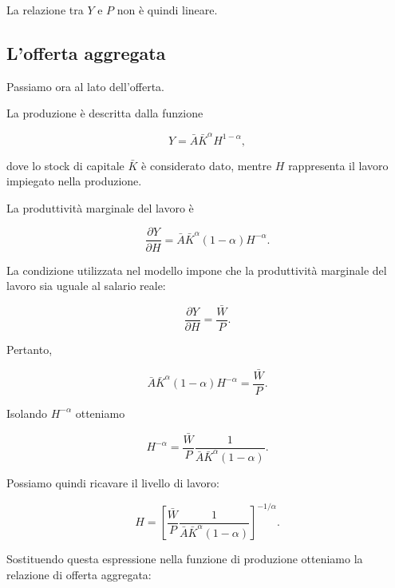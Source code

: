 La relazione tra $Y$ e $P$ non è quindi lineare.


\subsection{L'offerta aggregata}

Passiamo ora al lato dell'offerta.

La produzione è descritta dalla funzione

\begin{equation*}
    Y=\bar{A}\bar{K}^{\alpha}H^{1-\alpha},
    \label{eq:adas_prod}
\end{equation*}

dove lo stock di capitale $\bar{K}$ è considerato dato, mentre
$H$ rappresenta il lavoro impiegato nella produzione.

La produttività marginale del lavoro è

\begin{equation*}
    \frac{\partial Y}{\partial H}
    =
    \bar{A}\bar{K}^{\alpha}(1-\alpha)H^{-\alpha}.
\end{equation*}

La condizione utilizzata nel modello impone che la produttività
marginale del lavoro sia uguale al salario reale:

\begin{equation*}
    \frac{\partial Y}{\partial H}
    =
    \frac{\bar{W}}{P}.
\end{equation*}

Pertanto,

\begin{equation*}
    \bar{A}\bar{K}^{\alpha}(1-\alpha)H^{-\alpha}
    =
    \frac{\bar{W}}{P}.
\end{equation*}

Isolando $H^{-\alpha}$ otteniamo

\begin{equation*}
    H^{-\alpha}
    =
    \frac{\bar{W}}{P}
    \frac{1}{
        \bar{A}\bar{K}^{\alpha}(1-\alpha)
    }.
\end{equation*}

Possiamo quindi ricavare il livello di lavoro:

\begin{equation*}
    H
    =
    \left[
    \frac{\bar{W}}{P}
    \frac{1}{
        \bar{A}\bar{K}^{\alpha}(1-\alpha)
    }
    \right]^{-1/\alpha}.
    \label{eq:adas_H}
\end{equation*}

Sostituendo questa espressione nella funzione di produzione
otteniamo la relazione di offerta aggregata:

